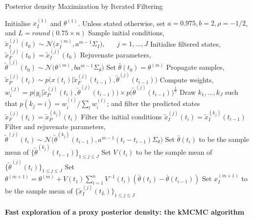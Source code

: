 \documentclass[a4paper,11pt,titlepage]{article}
\theoremstyle{plain} %
\begin{document}
\begin{algorithm}[H]
\caption{Posterior density Maximization by Iterated Filtering}
\label{alg:mif}
{\fontsize{12}{20}\selectfont
\begin{algorithmic}
\STATE Initialise $x^{(1)}_I$ and $\theta^{(1)}$.
\STATE Unless stated otherwise, set $a = 0.975,b=2,\rho = -1/2$, and $L=round(0.75\times n)$
	\STATE Sample initial conditions,  $\tilde{x}_I^{(j)}(t_0)\sim\mathcal{N}\big(x^{(m)}_I,a^{m-1}\Sigma_I\big),\;\;\;\;\;\;j=1,\dots,J$ 
	\STATE Initialise filtered states, $\tilde{x}_F^{(j)}(t_0)=\tilde{x}_I^{(j)}(t_0)$ 
	\STATE Rejuvenate parameters, $\tilde{\theta}^{(j)}(t_0)\sim\mathcal{N}\big(\theta^{(m)},ba^{m-1}\Sigma_{\theta}\big)$
	\STATE Set $\bar{\theta}(t_0)=\theta^{(m)}$
		\STATE Propagate samples, $\tilde{x}_P^{(j)}(t_i)\sim p\big(x(t_i)|\tilde{x}_F^{(j)}(t_{i-1}),\tilde{\theta}^{(j)}(t_{i-1})\big)$ 
		\STATE Compute weights, $w^{(j)}_i=p\big(y_i|\tilde{x}_P^{(j)}(t_i),\tilde{\theta}^{(j)}(t_{i-1})\big)\times p\big(\tilde{\theta}^{(j)}(t_{i-1})\big)^{\frac{1}{n}}$ 
		\STATE Draw $k_1,\dots,k_J$ such that $p(k_j=i)=w^{(i)}_i/\sum_l w_i^{(l)}$;
		\STATE and filter the predicted states $\tilde{x}_F^{(j)}(t_i)=\tilde{x}_P^{(k_j)}(t_i)$ 
		\STATE Filter the initial conditions $\tilde{x}_I^{(j)}(t_i)=\tilde{x}_I^{(k_j)}(t_{i-1})$
		\STATE Filter and rejuvenate parameters, $\tilde{\theta}^{(j)}(t_i)\sim\mathcal{N}\big(\tilde{\theta}^{(k_j)}(t_{i-1}),a^{m-1}(t_i-t_{i-1})\Sigma_{\theta}\big)$
		\STATE Set $\bar{\theta}(t_i)$ to be the sample mean of $\{\tilde{\theta}^{(k_j)}(t_{i-1})\}_{1\leq j \leq J}$
		\STATE Set $V(t_i)$ to be the sample mean of $\{\tilde{\theta}^{(j)}(t_{i})\}_{1\leq j \leq J}$
	\ENDFOR
	\STATE Set $\theta^{(m+1)}=\theta^{(m)}+V(t_1)\sum_{i=1}^n V^{-1}(t_i)(\bar{\theta}(t_i)-\bar{\theta}(t_{i-1}))$
	\STATE Set $x_I^{(m+1)}$ to be the sample mean of $\{\tilde{x}_I^{(j)}(t_{L})\}_{1\leq j \leq J}$
\ENDFOR
\end{algorithmic}
}
\end{algorithm}

\paragraph{Fast exploration of a proxy posterior density: the kMCMC algorithm}\mbox{}\\
\end{document}
